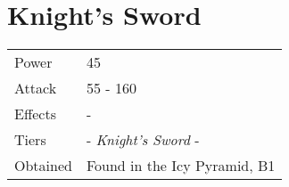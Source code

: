 \section{Knight's Sword}
\label{weapon:knights_sword}


\noindent\begin{tabularx}{\textwidth}[l]{lX}
	Power
	& 45
\\ %
	Attack
	& 55 - 160
\\ %
	Effects
	& -
\\ %
	Tiers
	& \nameref{weapon:steel_sword} - \textit{Knight's Sword} - \nameref{weapon:excalibur}
\\ %
	Obtained
	& Found in the Icy Pyramid, B1
\end{tabularx}

